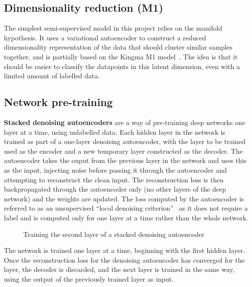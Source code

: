 \subsection{Dimensionality reduction (M1)} \label{m1}

The simplest semi-supervised model in this project relies on the manifold hypothesis. It uses a variational autoencoder to construct a
reduced dimensionality representation of the data that should cluster similar samples together, and is partially based 
on the Kingma M1 model~\cite{DBLP:journals/corr/KingmaRMW14}. The idea is that it should be 
easier to classify the datapoints in this latent dimension, even with a limited amount of labelled data.

\subsection{Network pre-training} \label{sdae}

\textbf{Stacked denoising autoencoders} are a way of pre-training deep networks one layer at a time, using unlabelled data. 
Each hidden layer in the network is 
trained as part of a one-layer denoising autoencoder, with the layer to be trained used as the encoder and a new temporary layer constructed
as the decoder. The autoencoder takes the ouput from the previous layer in the network and uses this as the input, injecting noise before 
passing it through the autoencoder and attempting to reconstruct the clean input. The reconstruction loss is then backpropagated through 
the autoencoder only (no other layers of the deep network) and the weights are updated. The loss computed by the autoencoder is referred to 
as an unsupervised ``local denoising criterion''~\cite{Vincent:2010:SDA:1756006.1953039} as it does not require a label and is computed only 
for one layer at a time rather than the whole network.
\begin{figure}[H]
  \begin{center}
      \scalebox{.75}{}
      \caption{Training the second layer of a stacked denoising autoencoder}
      \label{fig:illustration_sdae}
  \end{center}
\end{figure}

The network is trained one layer at a time, beginning with the first hidden layer. Once the reconstruction loss for the denoising autoencoder has 
converged for the layer, the decoder is discarded, and the next layer is trained in the same way, using the output of the previously trained
layer as input.

